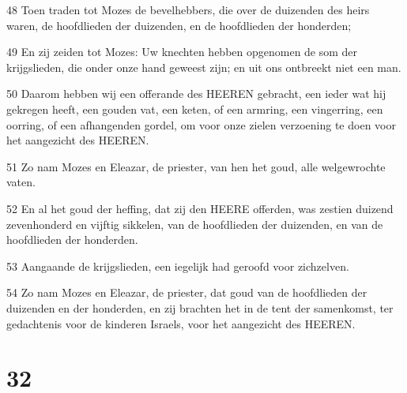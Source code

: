 \par 48 Toen traden tot Mozes de bevelhebbers, die over de duizenden des heirs waren, de hoofdlieden der duizenden, en de hoofdlieden der honderden;
\par 49 En zij zeiden tot Mozes: Uw knechten hebben opgenomen de som der krijgslieden, die onder onze hand geweest zijn; en uit ons ontbreekt niet een man.
\par 50 Daarom hebben wij een offerande des HEEREN gebracht, een ieder wat hij gekregen heeft, een gouden vat, een keten, of een armring, een vingerring, een oorring, of een afhangenden gordel, om voor onze zielen verzoening te doen voor het aangezicht des HEEREN.
\par 51 Zo nam Mozes en Eleazar, de priester, van hen het goud, alle welgewrochte vaten.
\par 52 En al het goud der heffing, dat zij den HEERE offerden, was zestien duizend zevenhonderd en vijftig sikkelen, van de hoofdlieden der duizenden, en van de hoofdlieden der honderden.
\par 53 Aangaande de krijgslieden, een iegelijk had geroofd voor zichzelven.
\par 54 Zo nam Mozes en Eleazar, de priester, dat goud van de hoofdlieden der duizenden en der honderden, en zij brachten het in de tent der samenkomst, ter gedachtenis voor de kinderen Israels, voor het aangezicht des HEEREN.

\chapter{32}

